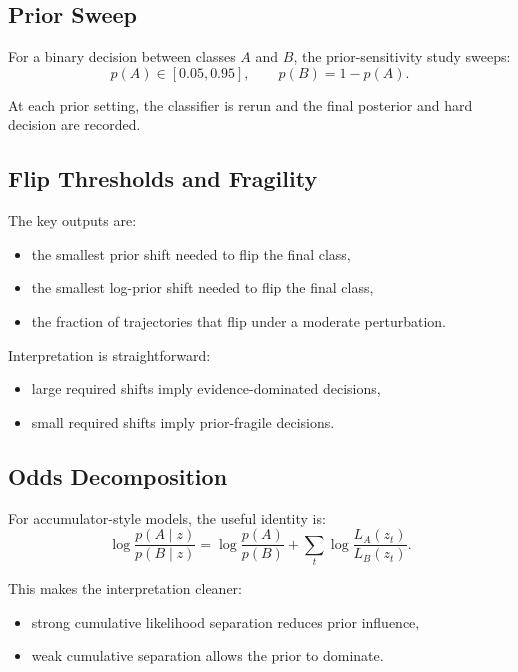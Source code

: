 \documentclass[11pt]{article}
\begin{document}
\subsection{Prior Sweep}

For a binary decision between classes $A$ and $B$, the prior-sensitivity study
sweeps:
\begin{equation}
    p(A) \in [0.05, 0.95],
    \qquad
    p(B) = 1 - p(A).
\end{equation}

At each prior setting, the classifier is rerun and the final posterior and hard
decision are recorded.

\subsection{Flip Thresholds and Fragility}

The key outputs are:
\begin{itemize}[leftmargin=1.5em]
    \item the smallest prior shift needed to flip the final class,
    \item the smallest log-prior shift needed to flip the final class,
    \item the fraction of trajectories that flip under a moderate perturbation.
\end{itemize}

Interpretation is straightforward:
\begin{itemize}[leftmargin=1.5em]
    \item large required shifts imply evidence-dominated decisions,
    \item small required shifts imply prior-fragile decisions.
\end{itemize}

\subsection{Odds Decomposition}

For accumulator-style models, the useful identity is:
\begin{equation}
    \log \frac{p(A \mid z)}{p(B \mid z)}
    =
    \log \frac{p(A)}{p(B)}
    +
    \sum_t \log \frac{L_A(z_t)}{L_B(z_t)}.
\end{equation}

This makes the interpretation cleaner:
\begin{itemize}[leftmargin=1.5em]
    \item strong cumulative likelihood separation reduces prior influence,
    \item weak cumulative separation allows the prior to dominate.
\end{itemize}
\end{document}
